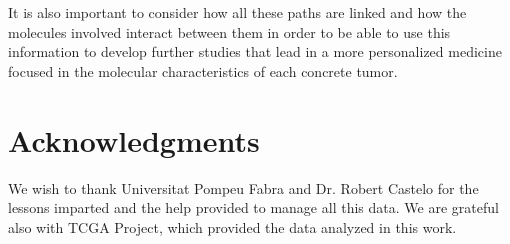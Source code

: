 \documentclass[9pt,twocolumn,twoside]{gsajnl}
\begin{document}
It is also important to consider how all these paths are linked and how the molecules involved interact between them in order to be able to use this information to develop further studies that lead in a more personalized medicine focused in the molecular characteristics of each concrete tumor. 

\section*{Acknowledgments}
We wish to thank Universitat Pompeu Fabra and Dr. Robert Castelo for the lessons imparted and the help provided to manage all this data. We are grateful also with TCGA Project, which provided the data analyzed in this work.


\end{document}
